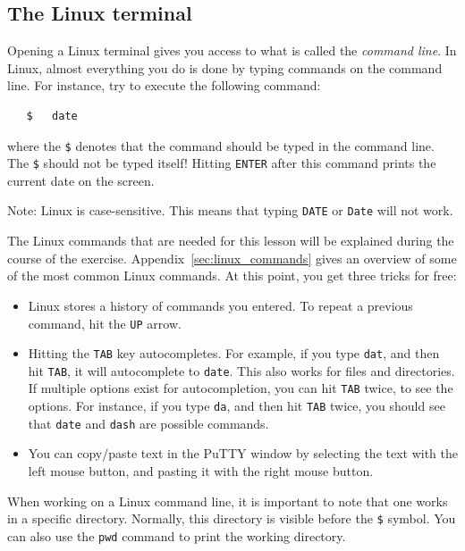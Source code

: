\documentclass[a4paper]{article}
\begin{document}
\subsection{The Linux terminal}
%
\par
Opening a Linux terminal gives you access to what is called the \emph{command line}. In Linux, almost everything you do is done by typing commands on the command line. For instance, try to execute the following command:
%
\begin{verbatim}
   $   date
\end{verbatim}
%
where the \texttt{\$} denotes that the command should be typed in the command line. The \texttt{\$} should not be typed itself! Hitting \texttt{ENTER} after this command prints the current date on the screen.
%
\par
Note: Linux is case-sensitive. This means that typing \verb+DATE+ or \verb+Date+ will not work.
%
\par
The Linux commands that are needed for this lesson will be explained during the course of the exercise. Appendix~\ref{sec:linux_commands} gives an overview of some of the most common Linux commands. At this point, you get three tricks for free:
%
\begin{itemize}
	\item Linux stores a history of commands you entered. To repeat a previous command, hit the \texttt{UP} arrow.
	\item Hitting the \texttt{TAB} key autocompletes. For example, if you type \texttt{dat}, and then hit \texttt{TAB}, it will autocomplete to \texttt{date}. This also works for files and directories. If multiple options exist for autocompletion, you can hit \texttt{TAB} twice, to see the options. For instance, if you type \texttt{da}, and then hit \texttt{TAB} twice, you should see that \texttt{date} and \texttt{dash} are possible commands.
	\item You can copy/paste text in the PuTTY window by selecting the text with the left mouse button, and pasting it with the right mouse button.
\end{itemize}
%
\par
When working on a Linux command line, it is important to note that one works in a specific directory. Normally, this directory is visible before the \texttt{\$} symbol. You can also use the \verb+pwd+ command to print the working directory.
%
\end{document}
